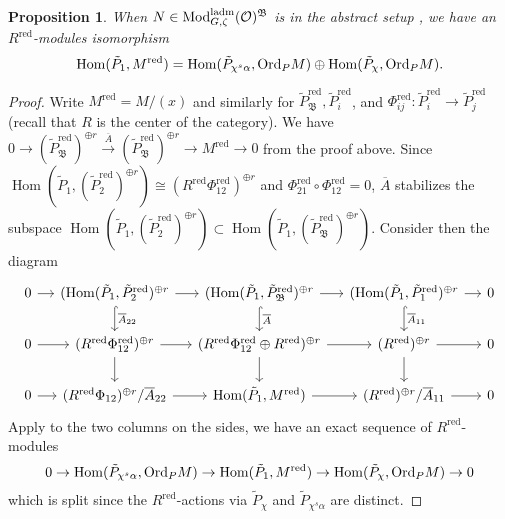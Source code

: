\documentclass[leqno]{amsart}
\newcommand{\laMod}{\textnormal{Mod}^{\textnormal{ladm}}}
\newcommand{\Ord}{\textnormal{Ord}}
\DeclareMathOperator{\red}{red}
\newcommand{\oo}{\mathcal O}
\newcommand{\1}{\mathbf{1}}
\newcommand{\B}{\mathfrak B}
\DeclareMathOperator{\Hom}{Hom}
\newtheorem{prop}[thm]{Proposition}
\theoremstyle{definition}
\theoremstyle{remark}
\begin{document}
\begin{prop}
    When $N\in  \laMod_{G,\zeta}(\oo)^\B$ is in the abstract setup , we have an $R^{\red}$-modules isomorphism
    \begin{equation*}
        \Hom(\tilde{P}_1,M^{\red})=\Hom(\tilde{P}_{\chi^s\alpha}, \Ord_PM)\oplus \Hom(\tilde{P}_\chi,\Ord_PM).
    \end{equation*}
\end{prop}
\begin{proof}
Write $M^{\red}=M/(x)$ and similarly for $\tilde{P}_\B^{\red}, \tilde{P}_i^{\red}$, and $\Phi_{ij}^{\red}\colon \tilde{P}_i^{\red}\to \tilde{P}_j^{\red}$ (recall that $R$ is the center of the category).
We have $0\to (\tilde{P}_\B^{\red})^{\oplus r}\xrightarrow{\overline{A}}(\tilde{P}_\B^{\red})^{\oplus r}\to M^{\red}\to 0$ from the proof above.
Since $\Hom(\tilde{P}_1,(\tilde{P}_2^{\red})^{\oplus r})\cong (R^{\red} \Phi_{12}^{\red})^{\oplus r}$ and $\Phi_{21}^{\red}\circ \Phi_{12}^{\red}=0$,
$\overline{A}$ stabilizes the subspace $\Hom(\tilde{P}_1,(\tilde{P}_2^{\red})^{\oplus r})\subset \Hom(\tilde{P}_1,(\tilde{P}_\B^{\red})^{\oplus r})$.
Consider then the diagram
\begin{equation*}
    \begin{tikzcd}[column sep=small]
        0 \arrow[r] & (\Hom(\tilde{P}_1,\tilde{P}_2^{\red})^{\oplus r} \arrow[d,"\overline{A}_{22}",hookrightarrow] \arrow[r] & (\Hom(\tilde{P}_1,\tilde{P}_\B^{\red})^{\oplus r} \arrow[d,"\overline{A}",hookrightarrow] \arrow[r] & (\Hom(\tilde{P}_1,\tilde{P}_1^{\red})^{\oplus r} \arrow[d,"\overline{A}_{11}",hookrightarrow] \arrow[r] & 0 \\ 
        0 \arrow[r] &(R^{\red}\Phi_{12}^{\red})^{\oplus r} \arrow[d] \arrow[r] & (R^{\red}\Phi_{12}^{\red}\oplus R^{\red})^{\oplus r} \arrow[d] \arrow[r] & (R^{\red})^{\oplus r}\arrow[d] \arrow[r] & 0 \\ 
        0 \arrow[r] & (R^{\red} \Phi_{12})^{\oplus r}/\overline{A}_{22}  \arrow[r] & \Hom(\tilde{P}_1,M^{\red}) \arrow[r] & (R^{\red})^{\oplus r}/\overline{A}_{11}\arrow[r] & 0 
    \end{tikzcd}
\end{equation*}
Apply  to the two columns on the sides,  we have an exact sequence of $R^{\red}$-modules
\begin{equation*}
    0\to \Hom(\tilde{P}_{\chi^s\alpha}, \Ord_PM)\to \Hom(\tilde{P}_1,M^{\red})\to \Hom(\tilde{P}_\chi,\Ord_PM)\to 0
\end{equation*}
which is split since the $R^{\red}$-actions via $\tilde{P}_\chi$ and $\tilde{P}_{\chi^s\alpha}$ are distinct.
\end{proof}  




\end{document}
